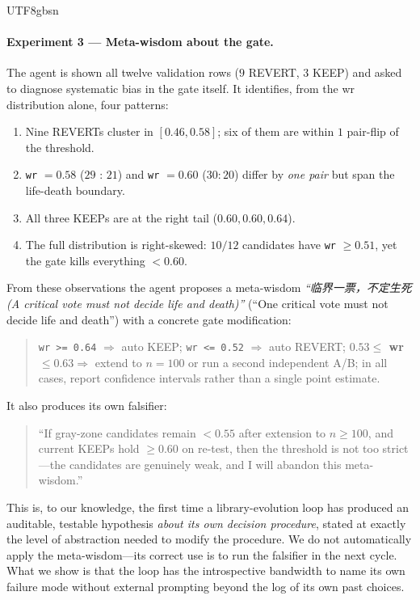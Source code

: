 \documentclass{article}
\begin{document}
\begin{CJK*}{UTF8}{gbsn}
\paragraph{Experiment 3 — Meta-wisdom about the gate.} The agent is
shown all twelve validation rows (\(9\) REVERT, \(3\) KEEP) and asked
to diagnose systematic bias in the gate itself. It identifies, from
the wr distribution alone, four patterns:
\begin{enumerate}[leftmargin=*, topsep=2pt, itemsep=0pt]
  \item Nine REVERTs cluster in \([0.46, 0.58]\); six of them are
    within \(1\) pair-flip of the threshold.
  \item \texttt{wr} \(= 0.58\) (\(29\) : \(21\)) and \texttt{wr} \(= 0.60\)
    (\(30 : 20\)) differ by \emph{one pair} but span the life-death
    boundary.
  \item All three KEEPs are at the right tail
    (\(0.60, 0.60, 0.64\)).
  \item The full distribution is right-skewed: \(10/12\) candidates
    have \texttt{wr} \(\geq 0.51\), yet the gate kills everything
    \(< 0.60\).
\end{enumerate}
From these observations the agent proposes a meta-wisdom
\emph{``临界一票，不定生死 (\emph{A critical vote must not decide life and death})''} (``One critical vote must not decide
life and death'') with a concrete gate modification:
\begin{quote}\small
\texttt{wr >= 0.64} \(\Rightarrow\) auto KEEP; \texttt{wr <= 0.52}
\(\Rightarrow\) auto REVERT; \textbf{\(0.53 \leq\) wr} \(\leq 0.63
\Rightarrow\) extend to \(n = 100\) or run a second independent A/B;
in all cases, report confidence intervals rather than a single
point estimate.
\end{quote}
It also produces its own falsifier:
\begin{quote}\small
``If gray-zone candidates remain \(< 0.55\) after extension to \(n
\geq 100\), and current KEEPs hold \(\geq 0.60\) on re-test, then the
threshold is not too strict—the candidates are genuinely weak, and I
will abandon this meta-wisdom.''
\end{quote}

\noindent This is, to our knowledge, the first time a library-evolution
loop has produced an auditable, testable hypothesis
\emph{about its own decision procedure}, stated at exactly the level
of abstraction needed to modify the procedure. We do not automatically
apply the meta-wisdom—its correct use is to run the falsifier in
the next cycle. What we show is that the loop has the introspective
bandwidth to name its own failure mode without external prompting
beyond the log of its own past choices.


\end{CJK*}
\end{document}
